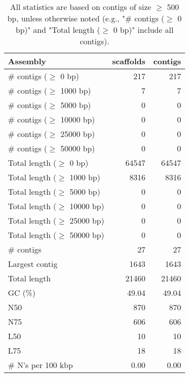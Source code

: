 \documentclass[12pt,a4paper]{article}
\begin{document}
\begin{table}[ht]
\begin{center}
\caption{All statistics are based on contigs of size $\geq$ 500 bp, unless otherwise noted (e.g., "\# contigs ($\geq$ 0 bp)" and "Total length ($\geq$ 0 bp)" include all contigs).}
\begin{tabular}{|l*{2}{|r}|}
\hline
Assembly & scaffolds & contigs \\ \hline
\# contigs ($\geq$ 0 bp) & 217 & 217 \\ \hline
\# contigs ($\geq$ 1000 bp) & 7 & 7 \\ \hline
\# contigs ($\geq$ 5000 bp) & 0 & 0 \\ \hline
\# contigs ($\geq$ 10000 bp) & 0 & 0 \\ \hline
\# contigs ($\geq$ 25000 bp) & 0 & 0 \\ \hline
\# contigs ($\geq$ 50000 bp) & 0 & 0 \\ \hline
Total length ($\geq$ 0 bp) & 64547 & 64547 \\ \hline
Total length ($\geq$ 1000 bp) & 8316 & 8316 \\ \hline
Total length ($\geq$ 5000 bp) & 0 & 0 \\ \hline
Total length ($\geq$ 10000 bp) & 0 & 0 \\ \hline
Total length ($\geq$ 25000 bp) & 0 & 0 \\ \hline
Total length ($\geq$ 50000 bp) & 0 & 0 \\ \hline
\# contigs & 27 & 27 \\ \hline
Largest contig & 1643 & 1643 \\ \hline
Total length & 21460 & 21460 \\ \hline
GC (\%) & 49.04 & 49.04 \\ \hline
N50 & 870 & 870 \\ \hline
N75 & 606 & 606 \\ \hline
L50 & 10 & 10 \\ \hline
L75 & 18 & 18 \\ \hline
\# N's per 100 kbp & 0.00 & 0.00 \\ \hline
\end{tabular}
\end{center}
\end{table}
\end{document}
